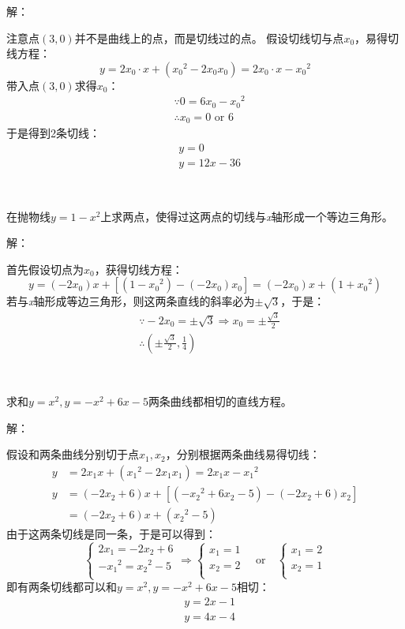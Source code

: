 解：

注意点$\left( 3,0 \right) $并不是曲线上的点，而是切线过的点。
假设切线切与点$x_0$，易得切线方程：
\[
y=2x_0\cdot x+\left( {x_0}^2-2x_0x_0 \right) =2x_0\cdot x-{x_0}^2
\]
带入点$\left( 3,0 \right) $求得$x_0$：
\begin{align*}
&\because 0=6x_0-{x_0}^2 \\
&\therefore x_0=0\,\,\mathrm{or}\,\,6
\end{align*}
于是得到2条切线：
\begin{align*}
&y=0 \\
&y=12x-36
\end{align*}

~

\begin{exercise}
在抛物线$y=1-x^2$上求两点，使得过这两点的切线与{\it x}轴形成一个等边三角形。
\end{exercise}

解：

首先假设切点为$x_0$，获得切线方程：
\[
y=\left( -2x_0 \right) x+\left[ \left( 1-{x_0}^2 \right) -\left( -2x_0 \right) x_0 \right] =\left( -2x_0 \right) x+\left( 1+{x_0}^2 \right)
\]
若与{\it x}轴形成等边三角形，则这两条直线的斜率必为$\pm \sqrt{3}$，于是：
\begin{align*}
&\because -2x_0=\pm \sqrt{3}\Rightarrow x_0=\pm \frac{\sqrt{3}}{2} \\
&\therefore \left( \pm \frac{\sqrt{3}}{2},\frac{1}{4} \right)
\end{align*}

~

\begin{exercise}
求和$y=x^2,y=-x^2+6x-5$两条曲线都相切的直线方程。
\end{exercise}

解：

假设和两条曲线分别切于点$x_1,x_2$，分别根据两条曲线易得切线：
\begin{align*}
y&=2x_1x+\left( {x_1}^2-2x_1x_1 \right) =2x_1x-{x_1}^2 \\
y&=\left( -2x_2+6 \right) x+\left[ \left( -{x_2}^2+6x_2-5 \right) -\left( -2x_2+6 \right) x_2 \right] \\
&=\left( -2x_2+6 \right) x+\left( {x_2}^2-5 \right)
\end{align*}
由于这两条切线是同一条，于是可以得到：
\[
\begin{cases}
	2x_1=-2x_2+6\\
	-{x_1}^2={x_2}^2-5\\
\end{cases}\Rightarrow \begin{cases}
	x_1=1\\
	x_2=2\\
\end{cases} \quad \mathrm{or} \quad \begin{cases}
	x_1=2\\
	x_2=1\\
\end{cases}
\]
即有两条切线都可以和$y=x^2,y=-x^2+6x-5$相切：
\begin{align*}
&y=2x-1 \\
&y=4x-4
\end{align*}


